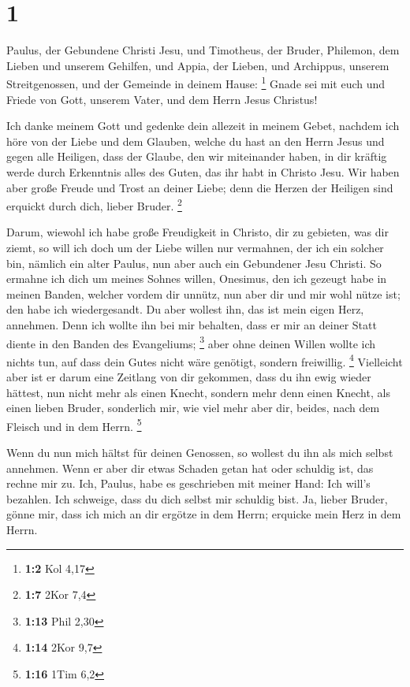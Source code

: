 \hypertarget{section}{%
\section{1}\label{section}}

 Paulus, der Gebundene Christi Jesu, und Timotheus, der
Bruder, Philemon, dem Lieben und unserem Gehilfen,  und
Appia, der Lieben, und Archippus, unserem Streitgenossen, und der
Gemeinde in deinem Hause: \footnote{\textbf{1:2} Kol 4,17} 
Gnade sei mit euch und Friede von Gott, unserem Vater, und dem Herrn
Jesus Christus!

 Ich danke meinem Gott und gedenke dein allezeit in meinem
Gebet,  nachdem ich höre von der Liebe und dem Glauben,
welche du hast an den Herrn Jesus und gegen alle Heiligen, 
dass der Glaube, den wir miteinander haben, in dir kräftig werde durch
Erkenntnis alles des Guten, das ihr habt in Christo Jesu. 
Wir haben aber große Freude und Trost an deiner Liebe; denn die Herzen
der Heiligen sind erquickt durch dich, lieber Bruder. \footnote{\textbf{1:7}
  2Kor 7,4}

 Darum, wiewohl ich habe große Freudigkeit in Christo, dir
zu gebieten, was dir ziemt,  so will ich doch um der Liebe
willen nur vermahnen, der ich ein solcher bin, nämlich ein alter Paulus,
nun aber auch ein Gebundener Jesu Christi.  So ermahne ich
dich um meines Sohnes willen, Onesimus, den ich gezeugt habe in meinen
Banden,  welcher vordem dir unnütz, nun aber dir und mir
wohl nütze ist; den habe ich wiedergesandt.  Du aber
wollest ihn, das ist mein eigen Herz, annehmen.  Denn ich
wollte ihn bei mir behalten, dass er mir an deiner Statt diente in den
Banden des Evangeliums; \footnote{\textbf{1:13} Phil 2,30} 
aber ohne deinen Willen wollte ich nichts tun, auf dass dein Gutes nicht
wäre genötigt, sondern freiwillig. \footnote{\textbf{1:14} 2Kor 9,7}
 Vielleicht aber ist er darum eine Zeitlang von dir
gekommen, dass du ihn ewig wieder hättest,  nun nicht mehr
als einen Knecht, sondern mehr denn einen Knecht, als einen lieben
Bruder, sonderlich mir, wie viel mehr aber dir, beides, nach dem Fleisch
und in dem Herrn. \footnote{\textbf{1:16} 1Tim 6,2}

 Wenn du nun mich hältst für deinen Genossen, so wollest du
ihn als mich selbst annehmen.  Wenn er aber dir etwas
Schaden getan hat oder schuldig ist, das rechne mir zu. 
Ich, Paulus, habe es geschrieben mit meiner Hand: Ich will's bezahlen.
Ich schweige, dass du dich selbst mir schuldig bist.  Ja,
lieber Bruder, gönne mir, dass ich mich an dir ergötze in dem Herrn;
erquicke mein Herz in dem Herrn.

